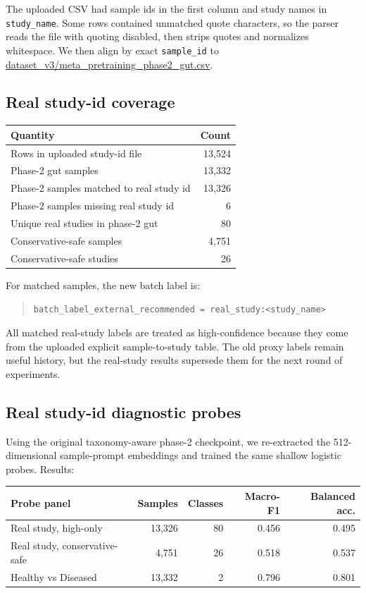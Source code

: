 \documentclass[11pt]{article}
\newcommand{\code}[1]{\texttt{\small #1}}
\newcommand{\filepath}[1]{\begingroup\urlstyle{tt}\small\url{#1}\endgroup}
\begin{document}
The uploaded CSV had sample ids in the first column and study names in \code{study\_name}.
Some rows contained unmatched quote characters, so the parser reads the file with quoting
disabled, then strips quotes and normalizes whitespace. We then align by exact
\code{sample\_id} to \filepath{dataset_v3/meta_pretraining_phase2_gut.csv}.

\subsection{Real study-id coverage}

\begin{center}
\begin{tabular}{lr}
\toprule
Quantity & Count \\
\midrule
Rows in uploaded study-id file & 13,524 \\
Phase-2 gut samples & 13,332 \\
Phase-2 samples matched to real study id & 13,326 \\
Phase-2 samples missing real study id & 6 \\
Unique real studies in phase-2 gut & 80 \\
Conservative-safe samples & 4,751 \\
Conservative-safe studies & 26 \\
\bottomrule
\end{tabular}
\end{center}

For matched samples, the new batch label is:

\begin{quote}
\code{batch\_label\_external\_recommended = real\_study:<study\_name>}
\end{quote}

All matched real-study labels are treated as high-confidence because they come from the
uploaded explicit sample-to-study table. The old proxy labels remain useful history, but
the real-study results supersede them for the next round of experiments.

\subsection{Real study-id diagnostic probes}

Using the original taxonomy-aware phase-2 checkpoint, we re-extracted the 512-dimensional
sample-prompt embeddings and trained the same shallow logistic probes. Results:

\begin{center}
\begin{tabular}{lrrrr}
\toprule
Probe panel & Samples & Classes & Macro-F1 & Balanced acc. \\
\midrule
Real study, high-only & 13,326 & 80 & 0.456 & 0.495 \\
Real study, conservative-safe & 4,751 & 26 & 0.518 & 0.537 \\
Healthy vs Diseased & 13,332 & 2 & 0.796 & 0.801 \\
\bottomrule
\end{tabular}
\end{center}
\end{document}
